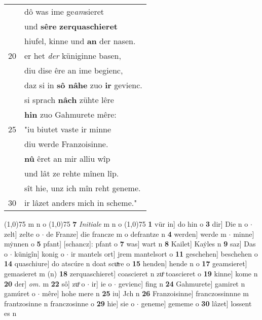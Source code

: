 \documentclass[8pt,a4paper,notitlepage]{article}
\begin{document}
\begin{table}[ht]
\begin{minipage}[t]{0.5\linewidth}
\begin{tabular}{rl}
 & dô was ime ge\textit{am}sieret\\ 
 & und \textbf{sêre} \textbf{zerquaschieret}\\ 
 & hiufel, kinne und \textbf{an} der nasen.\\ 
20 & er het \textit{der} küniginne basen,\\ 
 & diu dise êre an ime begienc,\\ 
 & daz si in \textbf{sô nâhe} zuo \textbf{ir} gevienc.\\ 
 & si sprach \textbf{nâch} zühte lêre\\ 
 & \textbf{hin} zuo Gahmurete mêre:\\ 
25 & "iu biutet vaste ir minne\\ 
 & diu werde Franzoisinne.\\ 
 & \textbf{nû} êret an mir alliu wîp\\ 
 & und lât ze rehte mînen lîp.\\ 
 & sît hie, unz ich mîn reht geneme.\\ 
30 & ir lâzet anders mich in scheme."\\ 
\end{tabular}
\scriptsize
\line(1,0){75} \newline
m n o \newline
\line(1,0){75} \newline
\textbf{7} \textit{Initiale} m n o  \newline
\line(1,0){75} \newline
\textbf{1} vür in] do hin o \textbf{3} dir] Die n o  $\cdot$ zelt] zelte o  $\cdot$ de Franze] die francze m o defrantze n \textbf{4} werden] werde m  $\cdot$ minne] mẏnnen o \textbf{5} pfant] [schancz]: pfant o \textbf{7} was] wart n \textbf{8} Kailet] Kaẏles n \textbf{9} saz] Das o  $\cdot$ künigîn] konig o  $\cdot$ ir mantels ort] jrem mantelsort o \textbf{11} geschehen] beschehen o \textbf{14} quaschiure] do atscúre n doat scuͯre o \textbf{15} henden] hende n o \textbf{17} geamsieret] gemasieret m (n) \textbf{18} zerquaschieret] coascieret n zuͦ toascieret o \textbf{19} kinne] kome n \textbf{20} der] \textit{om.} m \textbf{22} sô] zuͦ o  $\cdot$ ir] ie o  $\cdot$ gevienc] fing n \textbf{24} Gahmurete] gamiret n gamúret o  $\cdot$ mêre] hohe mere n \textbf{25} iu] Jch n \textbf{26} Franzoisinne] franczossinnne m frantzosinne n franczosinne o \textbf{29} hie] sie o  $\cdot$ geneme] gememe o \textbf{30} lâzet] lossent es n \newline
\end{minipage}
\end{table}
\end{document}
